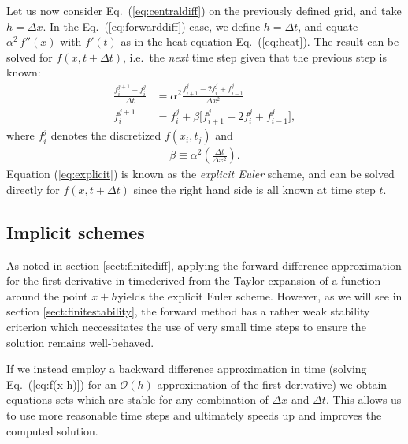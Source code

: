 \documentclass[a4paper, twocolumn]{article}
\newcommand{\eq} [1]{Eq.\ (\ref{eq:#1})}
\begin{document}
Let us now consider \eq{centraldiff} on the previously defined grid, and take $h=\Delta x$. In the \eq{forwarddiff} case, we define $h=\Delta t$, and equate $\alpha^2\,f''(x)$ with $f'(t)$ as in the heat equation \eq{heat}. The result can be solved for $f(x,t+\Delta t)$, i.e.\ the \textit{next} time step given that the previous step is known:
\begin{align}
\frac{f_i^{j+1} - f_i^j}{\Delta t} &= \alpha^2\frac{f_{i+1}^j - 2f_i^j + f_{i-1}^j}{\Delta x^2} \nonumber \\
%
f_i^{j+1} &= f_i^j + \beta \Big[f_{i+1}^j - 2f_i^j + f_{i-1}^j\Big], \label{eq:explicit}
\end{align}
where $f_i^j$ denotes the discretized $f(x_i,t_j)$ and 
\begin{align}
\beta\equiv\alpha^2\left(\frac{\Delta t}{\Delta x^2}\right).
\end{align}
Equation (\ref{eq:explicit}) is known as the \textit{explicit Euler} scheme, and can be solved directly for $f(x,t+\Delta t)$ since the right hand side is all known at time step $t$.


\subsection{Implicit schemes}
As noted in section \ref{sect:finitediff}, applying the forward difference approximation for the first derivative in time\textemdash derived from the Taylor expansion of a function around the point $x+h$\textemdash yields the explicit Euler scheme. However, as we will see in section \ref{sect:finitestability}, the forward method has a rather weak stability criterion which neccessitates the use of very small time steps to ensure the solution remains well-behaved. 

If we instead employ a backward difference approximation in time (solving \eq{f(x-h)} for an $\mathcal{O}(h)$ approximation of the first derivative) we obtain equations sets which are stable for any combination of $\Delta x$ and $\Delta t$. This allows us to use more reasonable time steps and ultimately speeds up and improves the computed solution. 
\end{document}
